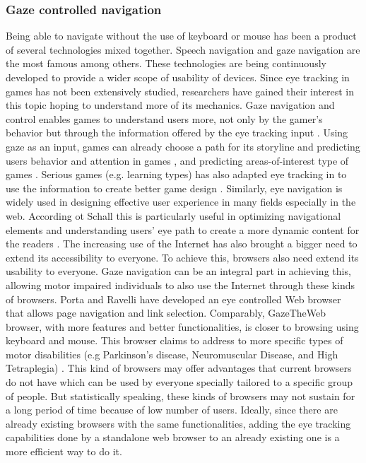 \documentclass[journal]{./IEEE/IEEEtran}
\begin{document}
\subsubsection{Gaze controlled navigation }\leavevmode

Being able to navigate without the use of keyboard or mouse has been a product of several technologies mixed together. Speech navigation and gaze navigation are the most famous among others. These technologies are being continuously developed to provide a wider scope of usability of devices.
Since eye tracking in games has not been extensively studied, researchers have gained their interest in this topic hoping to understand more of its mechanics. Gaze navigation and control enables games to understand users more, not only by the gamer’s behavior but through the information offered by the eye tracking input \cite {isokoski_joos_spakov_martin_2009} . Using gaze as an input, games can already choose a path for its storyline \cite{starker_bolt_1990 }  and predicting users behavior and attention in games   \cite{da_silva_prigent_courboulay_2007} \cite{ munoz_yannakakis_mulvey_hansen_gutierrez_sanchis_2011 } , and predicting areas-of-interest type of games  \cite{vickers_istance_smalley_2010}. Serious games (e.g. learning types) has also adapted eye tracking in to use the information to create better game design \cite{ turner_velloso_gellersen_sundstedt_2014 }.
Similarly, eye navigation is widely used in designing effective user experience in many fields especially in the web. According ot Schall  \cite{schall_2014} this is particularly useful in optimizing navigational elements  and understanding users’ eye path to create a more dynamic content for the readers \cite{marcus_2015}.
The increasing use of the Internet has also brought a bigger need to extend its accessibility to everyone. To achieve this, browsers also need extend its usability to everyone. Gaze navigation can be an integral part in achieving this, allowing motor impaired individuals to also use the Internet through these kinds of browsers. Porta and Ravelli  \cite {porta_ravelli_2009} have developed an eye controlled Web browser that allows page navigation and link selection. Comparably, GazeTheWeb browser, with more features and better functionalities, is closer to browsing using keyboard and mouse. This browser claims to address to more specific types of motor disabilities (e.g Parkinson’s disease, Neuromuscular Disease, and High Tetraplegia) \cite {mamem_2015}. This kind of browsers may offer advantages that current browsers do not have which can be used by everyone specially tailored to a specific group of people. But statistically speaking, these kinds of browsers may not sustain for a long period of time because of low number of users. Ideally, since there are already existing browsers with the same functionalities, adding the eye tracking capabilities done by a standalone web browser to an already existing one is a more efficient way to do it. 
\end{document}
